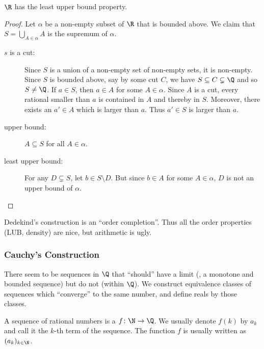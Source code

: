 \begin{theorem}
    $\R$ has the least upper bound property.
\end{theorem}
\begin{proof}
    Let $\alpha$ be a non-empty subset of $\R$ that is bounded above.
    We claim that $S = \bigcup_{A \in \alpha} A$ is the supremum of $\alpha$.
    \begin{description}
        \item[$s$ is a cut:] Since $S$ is a union of a non-empty set of
        non-empty sets, it is non-empty.
        Since $S$ is bounded above, say by some cut $C$, we have
        $S \subseteq C \subsetneq \Q$ and so $S \ne \Q$.
        If $a \in S$, then $a \in A$ for some
        $A \in \alpha$. Since $A$ is a cut, every rational smaller than $a$
        is contained in $A$ and thereby in $S$.
        Moreover, there exists an $a' \in A$ which is larger than $a$.
        Thus $a' \in S$ is larger than $a$.
        \item[upper bound:] $A \subseteq S$ for all $A \in \alpha$.
        \item[least upper bound:] For any $D \subsetneq S$,
        let $b \in S \setminus D$.
        But since $b \in A$ for some $A \in \alpha$, $D$ is not an upper
        bound of $\alpha$. \qedhere
    \end{description}
\end{proof}
Dedekind's construction is an ``order completion''.
Thus all the order properties (LUB, density) are nice, but arithmetic is
ugly.

\subsubsection{Cauchy's Construction} \label{sec:cauchy}
There seem to be sequences in $\Q$ that ``should'' have a limit (\eg, a
monotone and bounded sequence) but do not (within $\Q$).
We construct equivalence classes of sequences which ``converge'' to the same
number, and define reals by those classes.
\begin{definition}[Sequence]
    A sequence of rational numbers is a $f \colon \N \to \Q$.
    We usually denote $f(k)$ by $a_k$ and call it the $k$-th term of the
    sequence.
    The function $f$ is usually written as $(a_k)_{k \in \N}$.
\end{definition}

